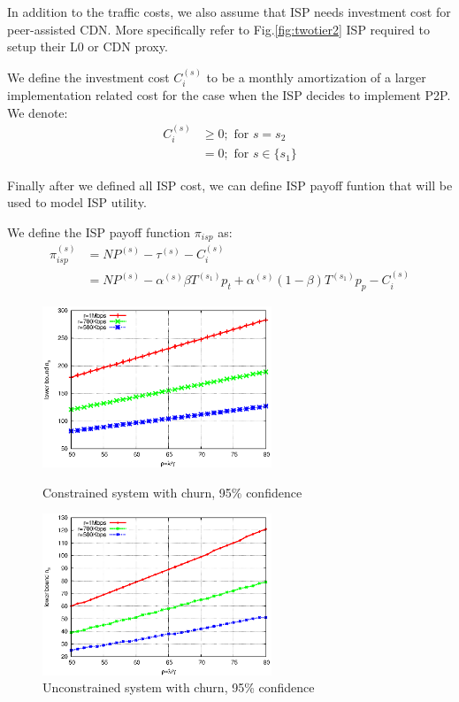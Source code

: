 \documentclass[paper]{ieice}
\begin{document}
In addition to the traffic costs, we also assume that ISP needs investment cost for peer-assisted CDN.
More specifically refer to Fig.\ref{fig:twotier2} ISP required to setup their L0 or CDN proxy.

\newtheorem{theorem6}{Definition}
\begin{theorem}
We define the investment cost $C^{(s)}_i$ to be a monthly amortization of a larger implementation related cost for the case when the ISP decides to implement P2P. 
We denote:
\begin{align}
	C^{(s)}_i &\ge 0; \text{ for } s = s_2 \\
	          &= 0; \text{ for } s \in \{s_1\}
\end{align}
\end{theorem}

Finally after we defined all ISP cost, we can define ISP payoff funtion that will be used to model ISP utility.  

\newtheorem{theorem7}{Definition}
\begin{theorem}
We define the ISP payoff function $\pi_{isp}$ as:
\begin{align}\label{eq:isppayoff}
	\pi_{isp}^{(s)} &= N P^{(s)} - \tau^{(s)} - C_i^{(s)} \\
	 &= N P^{(s)} - \alpha^{(s)} \beta T^{(s_1)} p_t + \alpha^{(s)} (1-\beta) T^{(s_1)} p_p - C_i^{(s)} 
\end{align}
\end{theorem}

\begin{figure}[tb]
\begin{minipage}[b]{0.4\linewidth}
\centering
\includegraphics[width=2.7in]{graphs/constrained.eps}
\caption{Constrained system with churn, 95\% confidence}
\label{fig:cons}
\end{minipage}
\hspace{0.5cm}
\begin{minipage}[b]{0.5\linewidth}
\centering
\includegraphics[width=2.7in]{graphs/unconstrained.eps}
\caption{Unconstrained system with churn, 95\% confidence}
\label{fig:uncons}
\end{minipage}
\end{figure}
 
\end{document}
